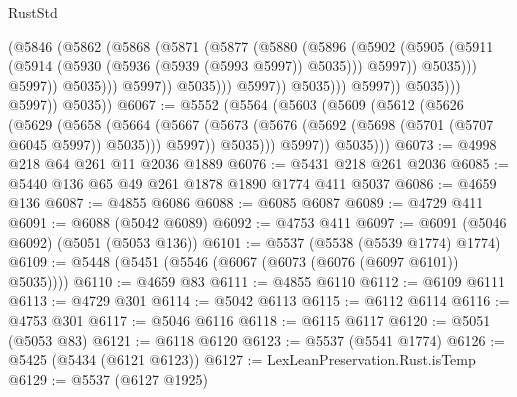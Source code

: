 \begin{lexlean}{RustStd}
\begin{coremodule}
                                          (@5846
                                            (@5862
                                              (@5868
                                                (@5871
                                                  (@5877
                                                    (@5880
                                                      (@5896
                                                        (@5902
                                                          (@5905
                                                            (@5911
                                                              (@5914
                                                                (@5930
                                                                  (@5936
                                                                    (@5939 (@5993 @5997))
                                                                    @5035)))
                                                              @5997))
                                                          @5035)))
                                                    @5997))
                                                @5035)))
                                          @5997))
                                      @5035)))
                                @5997))
                            @5035)))
                      @5997))
                  @5035)))
            @5997))
        @5035))
@6067 := @5552
    (@5564
      (@5603
        (@5609
          (@5612
            (@5626
              (@5629
                (@5658
                  (@5664
                    (@5667 (@5673 (@5676 (@5692 (@5698 (@5701 (@5707 @6045 @5997)) @5035))) @5997))
                    @5035)))
              @5997))
          @5035)))
@6073 := @4998 @218 @64 @261 @11 @2036 @1889
@6076 := @5431 @218 @261 @2036
@6085 := @5440 @136 @65 @49 @261 @1878 @1890 @1774 @411 @5037
@6086 := @4659 @136
@6087 := @4855 @6086
@6088 := @6085 @6087
@6089 := @4729 @411
@6091 := @6088 (@5042 @6089)
@6092 := @4753 @411
@6097 := @6091 (@5046 @6092) (@5051 (@5053 @136))
@6101 := @5537 (@5538 (@5539 @1774) @1774)
@6109 := @5448 (@5451 (@5546 (@6067 (@6073 (@6076 (@6097 @6101)) @5035))))
@6110 := @4659 @83
@6111 := @4855 @6110
@6112 := @6109 @6111
@6113 := @4729 @301
@6114 := @5042 @6113
@6115 := @6112 @6114
@6116 := @4753 @301
@6117 := @5046 @6116
@6118 := @6115 @6117
@6120 := @5051 (@5053 @83)
@6121 := @6118 @6120
@6123 := @5537 (@5541 @1774)
@6126 := @5425 (@5434 (@6121 @6123))
@6127 := LexLeanPreservation.Rust.isTemp
@6129 := @5537 (@6127 @1925)

\end{coremodule}
\end{lexlean}

